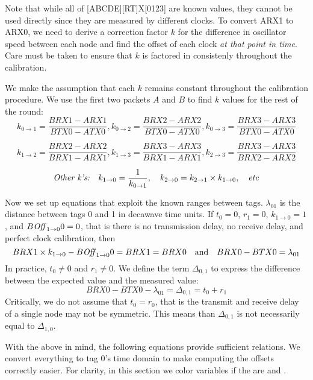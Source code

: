 \documentclass{article}
\begin{document}
Note that while all of [ABCDE][RT]X[0123] are known values, they cannot
be used directly since they are measured by different clocks. To convert ARX1
to ARX0, we need to derive a correction factor $k$ for the difference in
oscillator speed between each node and find the offset of each clock \emph{at
that point in time}.  Care must be taken to ensure that $k$ is factored in
consistenly throughout the calibration.

We make the assumption that each $k$ remains constant throughout the
calibration procedure. We use the first two packets $A$ and $B$ to find $k$
values for the rest of the round:
\[ k_{0\rightarrow1} = \frac{BRX1-ARX1}{BTX0-ATX0} ,%
   k_{0\rightarrow2} = \frac{BRX2-ARX2}{BTX0-ATX0} ,%
   k_{0\rightarrow3} = \frac{BRX3-ARX3}{BTX0-ATX0} \]

\[ k_{1\rightarrow2} = \frac{BRX2-ARX2}{BRX1-ARX1} ,%
   k_{1\rightarrow3} = \frac{BRX3-ARX3}{BRX1-ARX1} ,%
   k_{2\rightarrow3} = \frac{BRX3-ARX3}{BRX2-ARX2} \]

\[
  \textnormal{\emph{Other k's:}}~~~
  k_{1\rightarrow0} = \frac{1}{k_{0\rightarrow1}},~~~
  k_{2\rightarrow0} = k_{2\rightarrow1} \times k_{1\rightarrow0},~~~
  \textnormal{\emph{etc}}
\]

\newpage

Now we set up equations that exploit the known ranges between tags.
$\lambda_{01}$ is the distance between tags 0 and 1 in decawave time units.
If $t_0 = 0$, $r_1 = 0$, $k_{1\rightarrow0} = 1$, and $B\textnormal{\emph{Off}}_{1\rightarrow0}0 = 0$, that is
there is no transmission delay, no receive delay, and perfect clock
calibration, then
\[
  BRX1 \times k_{1\rightarrow0} - B\textnormal{\emph{Off}}_{1\rightarrow0}0 = BRX1 = BRX0
  ~~~\textnormal{and}~~~
  BRX0 - BTX0 = \lambda_{01}
\]
In practice, $t_0 \neq 0$ and $r_1 \neq 0$. We define the term $\Delta_{0,1}$
to express the difference between the expected value and the measured value:
\[
  BRX0 - BTX0 - \lambda_{01} = \Delta_{0,1} = t_0 + r_1
\]
Critically, we do not assume that $t_0 = r_0$, that is the transmit and
receive delay of a single node may not be symmetric. This means than
$\Delta_{0,1}$ is not necessarily equal to $\Delta_{1,0}$.

\medskip
\noindent
With the above in mind, the following equations provide sufficient relations.
We convert everything to tag 0's time domain to make computing the offsets correctly easier.
For clarity, in this section we color variables if the are  and .
\end{document}
